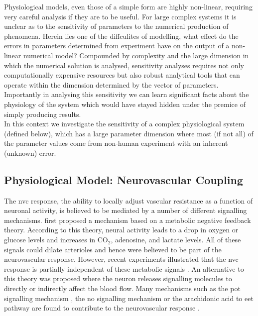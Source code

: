 Physiological models, even those of a simple form are highly non-linear, requiring very careful analysis if they are to be useful. For large complex systems it is unclear as to the sensitivity of parameters to the numerical production of phenomena. Herein lies one of the diffculites of modelling, what effect do the errors in parameters determined from experiment have on the output of a non-linear numerical model? Compounded by complexity and the large dimension in which the numerical solution is analysed, sensitivity analyses requires not only computationally expensive resources but also robust analytical tools that can operate within the dimension determined by the vector of parameters. Importantly in analysing this sensitivity we can learn significant facts about the physiology of the system which would have stayed hidden under the premice of simply producing results.  \\

In this context we investigate the sensitivity of a complex physiological system (defined below), which has a large parameter dimension where most (if not all) of the parameter values come from non-human experiment  with an inherent (unknown) error.

\subsection{Physiological Model: Neurovascular Coupling}
The \gls{nvc} response, the ability to locally adjust vascular resistance as a function of neuronal activity, is believed to be mediated by a number of different signalling mechanisms. \citet{Roy1890} first proposed a  mechanism based on a metabolic negative feedback theory. According to this theory, neural activity leads to a drop in oxygen or glucose levels and increases in CO$_2$, adenosine, and lactate levels. All of these signals could dilate arterioles and hence were believed to be part of the neurovascular response. However, recent experiments illustrated that the \gls{nvc} response is partially independent of these metabolic signals \citep{Leithner2010, Lindauer2010, Mintun2001, Powers1996, Makani2010}. An alternative to this theory was proposed where the neuron releases signalling molecules to directly or indirectly affect the blood flow. Many mechanisms such as the \gls{pot} signalling mechanism \cite{Filosa2006}, the \gls{no} signalling mechanism or the arachidonic acid to \gls{eet} pathway are found to contribute to the neurovascular response \citep{Attwell2010}.

